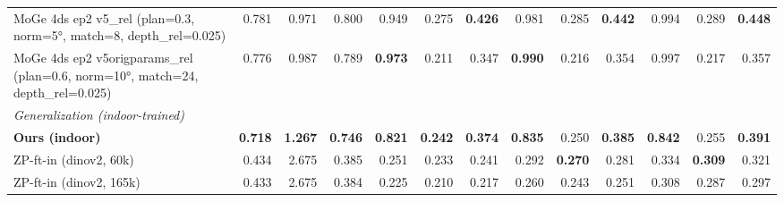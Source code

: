 \documentclass[10pt]{article}
\begin{document}
\begin{table}[t]
{\begin{tabular}{l r r r r r r r r r r r r}
MoGe 4ds ep2 v5\_rel (plan=0.3, norm=5°, match=8, depth\_rel=0.025) & 0.781 & 0.971 & 0.800 & 0.949 & 0.275 & \textbf{0.426} & 0.981 & 0.285 & \textbf{0.442} & 0.994 & 0.289 & \textbf{0.448} \\
MoGe 4ds ep2 v5origparams\_rel (plan=0.6, norm=10°, match=24, depth\_rel=0.025) & 0.776 & 0.987 & 0.789 & \textbf{0.973} & 0.211 & 0.347 & \textbf{0.990} & 0.216 & 0.354 & 0.997 & 0.217 & 0.357 \\
\midrule
\multicolumn{13}{l}{\textit{Generalization (indoor-trained)}} \\
\textbf{Ours (indoor)} & \textbf{0.718} & \textbf{1.267} & \textbf{0.746} & \textbf{0.821} & \textbf{0.242} & \textbf{0.374} & \textbf{0.835} & 0.250 & \textbf{0.385} & \textbf{0.842} & 0.255 & \textbf{0.391} \\
ZP-ft-in (dinov2, 60k) & 0.434 & 2.675 & 0.385 & 0.251 & 0.233 & 0.241 & 0.292 & \textbf{0.270} & 0.281 & 0.334 & \textbf{0.309} & 0.321 \\
ZP-ft-in (dinov2, 165k) & 0.433 & 2.675 & 0.384 & 0.225 & 0.210 & 0.217 & 0.260 & 0.243 & 0.251 & 0.308 & 0.287 & 0.297 \\
\bottomrule
\end{tabular}%
}
\end{table}

\clearpage
\end{document}
